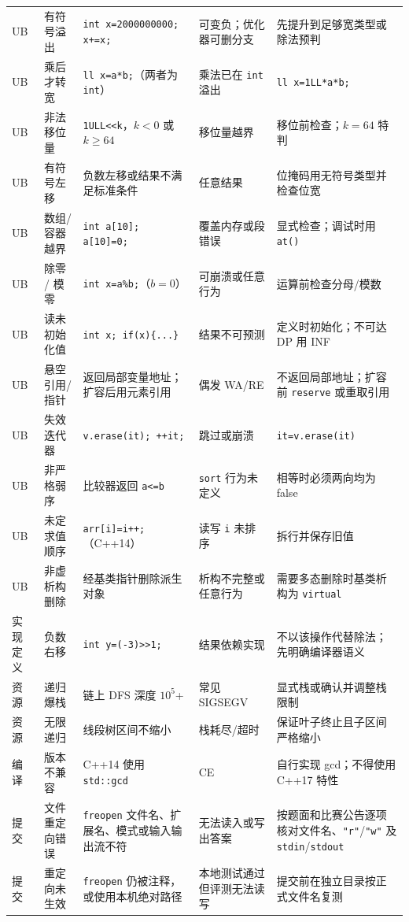 \documentclass[a4paper,11pt]{article}
\newcommand{\code}[1]{\texttt{#1}}
\begin{document}
\begin{longtable}{L{1.1cm} L{2.5cm} L{4.3cm} L{2.8cm} L{4.8cm}}
UB & 有符号溢出 & \code{int x=2000000000; x+=x;} & 可变负；优化器可删分支 & 先提升到足够宽类型或除法预判\\[2mm]
UB & 乘后才转宽 & \code{ll x=a*b;}（两者为 \code{int}） & 乘法已在 \code{int} 溢出 & \code{ll x=1LL*a*b;}\\[2mm]
UB & 非法移位量 & \code{1ULL<<k}，$k<0$ 或 $k\ge64$ & 移位量越界 & 移位前检查；$k=64$ 特判\\[2mm]
UB & 有符号左移 & 负数左移或结果不满足标准条件 & 任意结果 & 位掩码用无符号类型并检查位宽\\[2mm]
UB & 数组/容器越界 & \code{int a[10]; a[10]=0;} & 覆盖内存或段错误 & 显式检查；调试时用 \code{at()}\\[2mm]
UB & 除零 / 模零 & \code{int x=a\%b;}（$b=0$） & 可崩溃或任意行为 & 运算前检查分母/模数\\[2mm]
UB & 读未初始化值 & \code{int x; if(x)\{...\}} & 结果不可预测 & 定义时初始化；不可达 DP 用 INF\\[2mm]
UB & 悬空引用/指针 & 返回局部变量地址；扩容后用元素引用 & 偶发 WA/RE & 不返回局部地址；扩容前 \code{reserve} 或重取引用\\[2mm]
UB & 失效迭代器 & \code{v.erase(it); ++it;} & 跳过或崩溃 & \code{it=v.erase(it)}\\[2mm]
UB & 非严格弱序 & 比较器返回 \code{a<=b} & \code{sort} 行为未定义 & 相等时必须两向均为 false\\[2mm]
UB & 未定求值顺序 & \code{arr[i]=i++;}（C++14） & 读写 \code{i} 未排序 & 拆行并保存旧值\\[2mm]
UB & 非虚析构删除 & 经基类指针删除派生对象 & 析构不完整或任意行为 & 需要多态删除时基类析构为 \code{virtual}\\[2mm]
实现定义 & 负数右移 & \code{int y=(-3)>>1;} & 结果依赖实现 & 不以该操作代替除法；先明确编译器语义\\[2mm]
资源 & 递归爆栈 & 链上 DFS 深度 $10^5$+ & 常见 SIGSEGV & 显式栈或确认并调整栈限制\\[2mm]
资源 & 无限递归 & 线段树区间不缩小 & 栈耗尽/超时 & 保证叶子终止且子区间严格缩小\\[2mm]
编译 & 版本不兼容 & C++14 使用 \code{std::gcd} & CE & 自行实现 gcd；不得使用 C++17 特性\\[2mm]
提交 & 文件重定向错误 & \code{freopen} 文件名、扩展名、模式或输入输出流不符 & 无法读入或写出答案 & 按题面和比赛公告逐项核对文件名、\code{"r"}/\code{"w"} 及 \code{stdin}/\code{stdout}\\[2mm]
提交 & 重定向未生效 & \code{freopen} 仍被注释，或使用本机绝对路径 & 本地测试通过但评测无法读写 & 提交前在独立目录按正式文件名复测\\[2mm]

\end{longtable}
\end{document}
